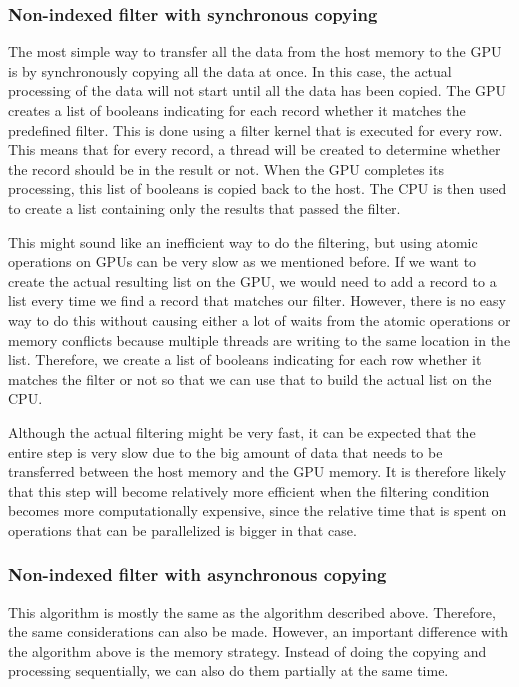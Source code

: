 \documentclass[a4paper,titlepage]{article}
\begin{document}
\subsubsection{Non-indexed filter with synchronous copying}
The most simple way to transfer all the data from the host memory to the GPU is by synchronously copying all the data at once. In this case, the actual processing of the data will not start until all the data has been copied. The GPU creates a list of booleans indicating for each record whether it matches the predefined filter. This is done using a filter kernel that is executed for every row. This means that for every record, a thread will be created to determine whether the record should be in the result or not. When the GPU completes its processing, this list of booleans is copied back to the host. The CPU is then used to create a list containing only the results that passed the filter.

This might sound like an inefficient way to do the filtering, but using atomic operations on GPUs can be very slow as we mentioned before. If we want to create the actual resulting list on the GPU, we would need to add a record to a list every time we find a record that matches our filter. However, there is no easy way to do this without causing either a lot of waits from the atomic operations or memory conflicts because multiple threads are writing to the same location in the list. Therefore, we create a list of booleans indicating for each row whether it matches the filter or not so that we can use that to build the actual list on the CPU.

Although the actual filtering might be very fast, it can be expected that the entire step is very slow due to the big amount of data that needs to be transferred between the host memory and the GPU memory. It is therefore likely that this step will become relatively more efficient when the filtering condition becomes more computationally expensive, since the relative time that is spent on operations that can be parallelized is bigger in that case.

\subsubsection{Non-indexed filter with asynchronous copying}
This algorithm is mostly the same as the algorithm described above. Therefore, the same considerations can also be made. However, an important difference with the algorithm above is the memory strategy. Instead of doing the copying and processing sequentially, we can also do them partially at the same time.
\end{document}
